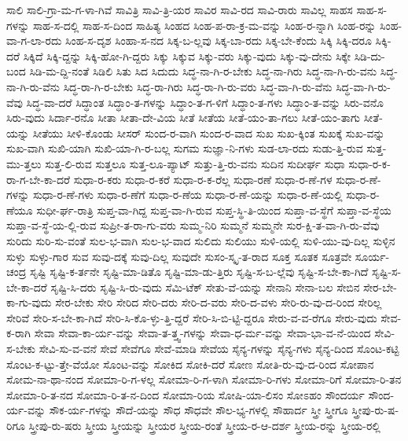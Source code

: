 {ಸಾಲಿ
ಸಾಲಿ-ಗ್ರಾ-ಮ-ಗ-ಳಾ-ಗಿವೆ
ಸಾವಿತ್ರಿ
ಸಾವಿ-ತ್ರಿ-ಯರ
ಸಾವಿರ
ಸಾವಿ-ರದ
ಸಾವಿ-ರಾರು
ಸಾವಿಲ್ಲ
ಸಾಹಸ
ಸಾಹ-ಸ-ಗಳನ್ನು
ಸಾಹ-ಸ-ದಲ್ಲಿ
ಸಾಹ-ಸ-ದಿಂದ
ಸಾಹಿತ್ಯ
ಸಿಂಹದ
ಸಿಂಹ-ಪ-ರಾ-ಕ್ರ-ಮ-ವನ್ನು
ಸಿಂಹ-ರ-ನ್ನಾಗಿ
ಸಿಂಹ-ರನ್ನು
ಸಿಂಹ-ವಾ-ಗ-ಲಾ-ರದು
ಸಿಂಹ-ಸ-ದೃಶ
ಸಿಂಹಾ-ಸ-ನದ
ಸಿಕ್ಕ-ಬ-ಲ್ಲವು
ಸಿಕ್ಕ-ಬಾ-ರದು
ಸಿಕ್ಕ-ಬೇ-ಕೆಂದು
ಸಿಕ್ಕಿ
ಸಿಕ್ಕಿ-ದರೂ
ಸಿಕ್ಕಿ-ದರೆ
ಸಿಕ್ಕಿದೆ
ಸಿಕ್ಕಿ-ದ್ದನ್ನು
ಸಿಕ್ಕಿ-ಹೋ-ಗಿ-ದ್ದರು
ಸಿಕ್ಕು
ಸಿಕ್ಕುವ
ಸಿಕ್ಕು-ವರು
ಸಿಕ್ಕು-ವುದು
ಸಿಕ್ಕು-ವು-ದೇನು
ಸಿಕ್ಕೇ
ಸಿಡಿ-ದು-ಬಂದ
ಸಿಡಿ-ಮ-ದ್ದಿ-ನಂತೆ
ಸಿಡಿಲಿ
ಸಿತು
ಸಿದ
ಸಿದುದು
ಸಿದ್ಧ-ನಾ-ಗಿ-ರ-ಬೇಕು
ಸಿದ್ಧ-ನಾ-ಗಿರು
ಸಿದ್ಧ-ನಾ-ಗಿ-ರು-ವನು
ಸಿದ್ಧ-ನಾ-ಗಿ-ರು-ವೆನು
ಸಿದ್ಧ-ರಾ-ಗಿ-ರ-ಬೇಕು
ಸಿದ್ಧ-ರಾ-ಗಿರು
ಸಿದ್ಧ-ರಾ-ಗಿ-ರು-ವರು
ಸಿದ್ಧ-ವಾ-ಗಿ-ರು-ವೆನು
ಸಿದ್ಧ-ವಾ-ಗಿ-ರು-ವೆವು
ಸಿದ್ಧ-ವಾ-ದರೆ
ಸಿದ್ಧಾಂತ
ಸಿದ್ಧಾಂ-ತ-ಗಳನ್ನು
ಸಿದ್ಧಾಂ-ತ-ಗ-ಳಿಗೆ
ಸಿದ್ಧಾಂ-ತ-ಗಳು
ಸಿದ್ಧಾಂ-ತ-ವನ್ನು
ಸಿರು-ವನೊ
ಸಿರು-ವುದು
ಸಿರ್ದಾ-ರನೊ
ಸೀತಾ
ಸೀತಾ-ದೇ-ವಿಯ
ಸೀತೆ
ಸೀತೆಯ
ಸೀತೆ-ಯಂ-ತಾ-ಗಲು
ಸೀತೆ-ಯಂ-ತಾಗು
ಸೀತೆ-ಯನ್ನು
ಸೀತೆಯು
ಸೀಳಿ-ಕೊಂಡು
ಸೀಸರ್
ಸುಂದ-ರ-ವಾಗಿ
ಸುಂದ-ರ-ವಾದ
ಸುಖ
ಸುಖ-ಕ್ಕಿಂತ
ಸುಖಕ್ಕೆ
ಸುಖ-ವನ್ನು
ಸುಖ-ವಾಗಿ
ಸುಖಿ-ಯಾಗಿ
ಸುಖಿ-ಯಾ-ಗಿ-ರ-ಬಲ್ಲ
ಸುಗಮ
ಸುಜ್ಞಾ-ನಿ-ಗಳು
ಸುಡ-ಲಾ-ರದು
ಸುಡು-ತ್ತಿ-ರುವ
ಸುತ್ತ-ಮು-ತ್ತಲು
ಸುತ್ತ-ಲಿ-ರುವ
ಸುತ್ತಲೂ
ಸುತ್ತ-ಲೂ-ಪ್ಯಾಟ್
ಸುತ್ತು-ತ್ತಿ-ರು-ವನು
ಸುದಿನ
ಸುದೀರ್ಘ
ಸುಧಾ
ಸುಧಾ-ರ-ಕ-ರಾ-ಗ-ಬೇ-ಕಾ-ದರೆ
ಸುಧಾ-ರ-ಕರು
ಸುಧಾ-ರ-ಕರೆ
ಸುಧಾ-ರ-ಕ-ರೆಲ್ಲ
ಸುಧಾ-ರಣೆ
ಸುಧಾ-ರ-ಣೆ-ಗಳ
ಸುಧಾ-ರ-ಣೆ-ಗಳನ್ನು
ಸುಧಾ-ರ-ಣೆ-ಗಳು
ಸುಧಾ-ರ-ಣೆಗೆ
ಸುಧಾ-ರ-ಣೆಯ
ಸುಧಾ-ರ-ಣೆ-ಯನ್ನು
ಸುಧಾ-ರ-ಣೆ-ಯಲ್ಲಿ
ಸುಧಾ-ರ-ಣೆಯೂ
ಸುಧೀ-ರ್ಘ-ರಾತ್ರಿ
ಸುಪ್ತ-ವಾ-ಗಿದ್ದ
ಸುಪ್ತ-ವಾ-ಗಿ-ರುವ
ಸುಪ್ತ-ಸ್ಥಿ-ತಿ-ಯಿಂದ
ಸುಪ್ತಾ-ವ-ಸ್ಥೆಗೆ
ಸುಪ್ತಾ-ವ-ಸ್ಥೆಯ
ಸುಪ್ತಾ-ವ-ಸ್ಥೆ-ಯ-ಲ್ಲಿ-ರುವ
ಸುಪ್ರೀ-ತ-ರಾ-ಗು-ವರು
ಸುಮ್ಮ-ನಿರಿ
ಸುಮ್ಮನೆ
ಸುಮ್ಮನೇ
ಸುರ-ಕ್ಷಿ-ತ-ವಾ-ಗಿ-ರು-ವೆವು
ಸುರಿದು
ಸುರಿ-ಸು-ವಂತೆ
ಸುಲ-ಭ-ವಾಗಿ
ಸುಲ-ಭ-ವಾದ
ಸುಲಿದು
ಸುಲಿಯು
ಸುಳಿ-ಯಲ್ಲಿ
ಸುಳಿ-ಯು-ವು-ದಿಲ್ಲ
ಸುಳ್ಳಿನ
ಸುಳ್ಳು
ಸುಳ್ಳು-ಗಾರ
ಸುವ
ಸುವು-ದಕ್ಕೆ
ಸುವು-ದಿಲ್ಲ
ಸುವುದೇ
ಸುಸಂ-ಸ್ಕೃ-ತ-ರಾದ
ಸೂಕ್ತ
ಸೂತಕ
ಸೂತ್ರವೇ
ಸೂರ್ಯ-ಚಂದ್ರ
ಸೃಷ್ಟಿ
ಸೃಷ್ಟಿ-ಕ-ರ್ತನೇ
ಸೃಷ್ಟಿ-ಮಾ-ಡಿತೊ
ಸೃಷ್ಟಿ-ಮಾ-ಡು-ತ್ತಿರು
ಸೃಷ್ಟಿ-ಸ-ಬ-ಲ್ಲೆವು
ಸೃಷ್ಟಿ-ಸ-ಬೇ-ಕಾ-ಗಿದೆ
ಸೃಷ್ಟಿ-ಸ-ಬೇ-ಕಾ-ದರೆ
ಸೃಷ್ಟಿ-ಸಿ-ದರು
ಸೃಷ್ಟಿ-ಸಿ-ರು-ವುದು
ಸೆಮಿ-ಟೆಕ್
ಸೇತು-ವೆ-ಯನ್ನು
ಸೇನಾನಿ
ಸೇನಾ-ಬಲ
ಸೇಬಿನ
ಸೇರ-ಬೇ-ಕಾ-ಗು-ವುದು
ಸೇರ-ಬೇಕು
ಸೇರಿ
ಸೇರಿದ
ಸೇರಿ-ದರು
ಸೇರಿ-ದ-ವರು
ಸೇರಿ-ದ-ವಳು
ಸೇರಿ-ರು-ವು-ದ-ರಿಂದ
ಸೇರಿಲ್ಲ
ಸೇರಿವೆ
ಸೇರಿ-ಸ-ಬೇ-ಕಾ-ಗಿದೆ
ಸೇರಿ-ಸಿ-ಕೊ-ಳ್ಳು-ತ್ತಿ-ದ್ದರೆ
ಸೇರಿ-ಸಿ-ಬಿ-ಟ್ಟಿ-ದ್ದರೂ
ಸೇರು-ವ-ವ-ರೆಗೂ
ಸೇರು-ವುದು
ಸೇವ-ಕ-ರಾಗಿ
ಸೇವಾ
ಸೇವಾ-ಕಾ-ರ್ಯ-ವನ್ನು
ಸೇವಾ-ತ-ತ್ತ್ವ-ಗಳನ್ನು
ಸೇವಾ-ಧ-ರ್ಮ-ವನ್ನು
ಸೇವಾ-ಭಾ-ವ-ನೆ-ಯಿಂದ
ಸೇವಿ-ಸ-ಬೇಕು
ಸೇವಿ-ಸು-ವ-ವನೆ
ಸೇವೆ
ಸೇವೆಗೂ
ಸೇವೆ-ಮಾಡಿ
ಸೇವೆಯ
ಸೈನ್ಯ-ಗಳನ್ನು
ಸೈನ್ಯ-ಗಳು
ಸೈನ್ಯ-ದಿಂದ
ಸೊಂಟ-ಕಟ್ಟಿ
ಸೊಂಟ-ಕ-ಟ್ಟು-ತ್ತೇ-ವೆಯೋ
ಸೊಂಟ-ವನ್ನು
ಸೋಕಿದ
ಸೋಕಿ-ದರೆ
ಸೋಣ
ಸೋತಿ-ರು-ವು-ದ-ರಿಂದ
ಸೋಪಾನ
ಸೋಮ-ನಾ-ಥಾ-ನಂದ
ಸೋಮಾ-ರಿ-ಗ-ಳಲ್ಲ
ಸೋಮಾ-ರಿ-ಗ-ಳಾಗಿ
ಸೋಮಾ-ರಿ-ಗಳು
ಸೋಮಾ-ರಿಗೆ
ಸೋಮಾ-ರಿ-ತನ
ಸೋಮಾ-ರಿ-ತ-ನದ
ಸೋಮಾ-ರಿ-ತ-ನ-ದಿಂದ
ಸೋಮಾ-ರಿಯ
ಸೋಷಿ-ಯಾ-ಲಿಸಂ
ಸೋಽಹಂ
ಸೌಂದರ್ಯ
ಸೌಂದ-ರ್ಯ-ವನ್ನು
ಸೌಕ-ರ್ಯ-ಗಳನ್ನು
ಸೌದೆ-ಯನ್ನು
ಸೌಧ
ಸೌಧವೇ
ಸೌಲ-ಭ್ಯ-ಗಳಲ್ಲಿ
ಸೌಹಾರ್ದ
ಸ್ತ್ರೀ
ಸ್ತ್ರೀಗೂ
ಸ್ತ್ರೀಪು-ರು-ಷ-ರಿಗೂ
ಸ್ತ್ರೀಪು-ರು-ಷರು
ಸ್ತ್ರೀಯ
ಸ್ತ್ರೀಯನ್ನು
ಸ್ತ್ರೀಯರ
ಸ್ತ್ರೀಯ-ರಂತೆ
ಸ್ತ್ರೀಯ-ರ-ಆ-ದರ್ಶ
ಸ್ತ್ರೀಯ-ರನ್ನು
ಸ್ತ್ರೀಯ-ರಲ್ಲಿ
}
